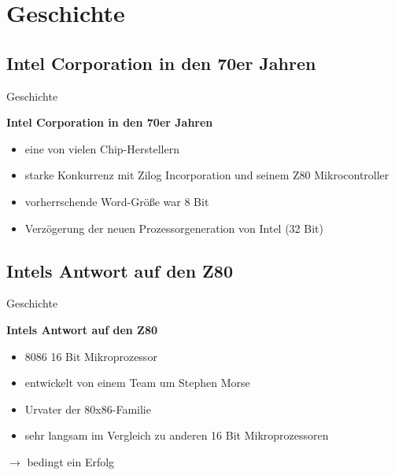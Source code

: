 \section{Geschichte}

\subsection{Intel Corporation in den 70er Jahren}
\begin{frame}{Geschichte}
	\begin{center}
		\textbf{Intel Corporation in den 70er Jahren}
	\end{center}
	\begin{itemize}
		\item eine von vielen Chip-Herstellern
		\item starke Konkurrenz mit Zilog Incorporation und seinem Z80 Mikrocontroller
		\item vorherrschende Word-Größe war 8 Bit
		\item Verzögerung der neuen Prozessorgeneration von Intel (32 Bit)
	\end{itemize}
\end{frame}

\subsection{Intels Antwort auf den Z80}
\begin{frame}{Geschichte}
	\begin{center}
		\textbf{Intels Antwort auf den Z80}
	\end{center}
	\begin{itemize}
		\item 8086 16 Bit Mikroprozessor
	 	\item entwickelt von einem Team um Stephen Morse 
		\item Urvater der 80x86-Familie 
		\item sehr langsam im Vergleich zu anderen 16 Bit Mikroprozessoren
	\end{itemize}

	$\rightarrow$ bedingt ein Erfolg
\end{frame}

